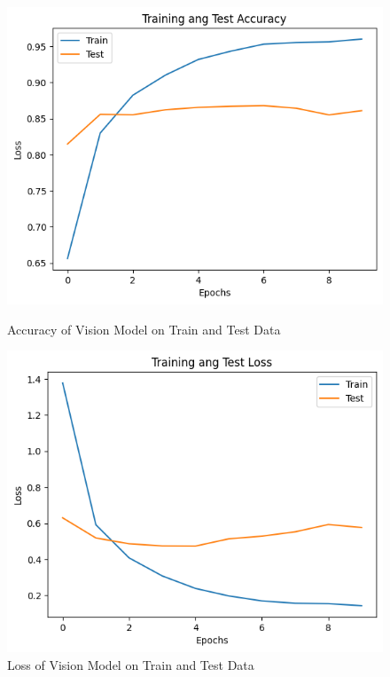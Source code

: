 \documentclass[fleqn, 10pt, twoside]{IOEGC}
\begin{document}
\begin{figure}[hbt]
	\centering
	\begin{minipage}[t]{0.45\textwidth}
		\centering
		\includegraphics[width=0.8\linewidth]{Graphics/accuracy_vision_model.png}
		\caption{Accuracy of Vision Model on Train and Test Data}
		\label{accuracy-vision}
	\end{minipage}
	\hfill
	\begin{minipage}[t]{0.45\textwidth}
		\centering
		\includegraphics[width=0.8\linewidth]{Graphics/loss_vision.png}
		\caption{Loss of Vision Model on Train and Test Data}
		\label{loss-vision}
	\end{minipage}
\end{figure}
\end{document}
